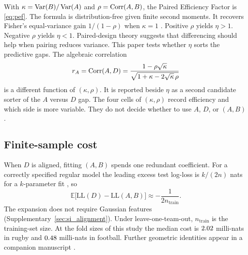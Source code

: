With $\kappa=\operatorname{Var}(B)/\operatorname{Var}(A)$ and $\rho=\operatorname{Corr}(A,B)$, the Paired Efficiency Factor is \cref{eq:pef}.
The formula is distribution-free given finite second moments.
It recovers Fisher's equal-variance gain $1/(1-\rho)$ when $\kappa=1$ \parencite{fisher1935}.
Positive $\rho$ yields $\eta>1$.
Negative $\rho$ yields $\eta<1$.
Paired-design theory suggests that differencing should help when pairing reduces variance.
This paper tests whether $\eta$ sorts the predictive gaps.
The algebraic correlation
\begin{equation}
  r_A=\operatorname{Corr}(A,D)=\frac{1-\rho\sqrt{\kappa}}{\sqrt{1+\kappa-2\sqrt{\kappa}\,\rho}}
  \label{eq:rA}
\end{equation}
is a different function of $(\kappa,\rho)$.
It is reported beside $\eta$ as a second candidate sorter of the $A$ versus $D$ gap.
The four cells of $(\kappa,\rho)$ record efficiency and which side is more variable.
They do not decide whether to use $A$, $D$, or $(A,B)$.

\subsection{Finite-sample cost}

When $D$ is aligned, fitting $(A,B)$ spends one redundant coefficient.
For a correctly specified regular model the leading excess test log-loss is $k/(2n)$ nats for a $k$-parameter fit \parencite{akaike1973,konishi2008}, so
\begin{equation}
  \mathbb{E}\bigl[\mathrm{LL}(D)-\mathrm{LL}(A,B)\bigr]\approx -\frac{1}{2n_{\mathrm{train}}}.
  \label{eq:halfn}
\end{equation}
The expansion does not require Gaussian features (Supplementary~\cref{sec:si_alignment}).
Under leave-one-team-out, $n_{\mathrm{train}}$ is the training-set size.
At the fold sizes of this study the median cost is $2.02$ milli-nats in rugby and $0.48$ milli-nats in football.
Further geometric identities appear in a companion manuscript \parencite{pefstatistics2026}.
